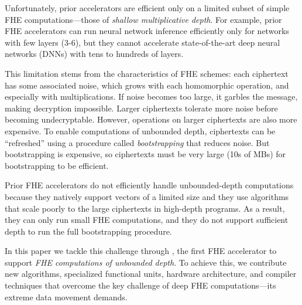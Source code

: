 Unfortunately, prior accelerators are efficient only on a limited subset of simple FHE
computations---those of \emph{shallow multiplicative depth}.
For example, prior FHE accelerators can run neural network inference efficiently only for networks with few layers (3-6),
but they cannot accelerate state-of-the-art deep neural networks (DNNs) with tens to hundreds of layers.

This limitation stems from the characteristics of FHE schemes:
each ciphertext has some associated noise, which grows with each homomorphic operation, and especially with multiplications.
If noise becomes too large, it garbles the message, making decryption impossible. 
Larger ciphertexts tolerate more noise before becoming undecryptable. 
However, operations on larger ciphertexts are also more expensive.
To enable computations of unbounded depth, ciphertexts can be ``refreshed'' using a procedure called \emph{bootstrapping}
that reduces noise. But bootstrapping is expensive, 
so ciphertexts must be very large (10s of MBs) for bootstrapping to be
efficient.

Prior FHE accelerators do not efficiently handle unbounded-depth computations because
they natively support vectors of a limited size and they use algorithms that scale poorly
to the large ciphertexts in high-depth programs.
As a result, they can only run small FHE computations, and they do not support sufficient depth
to run the full bootstrapping procedure.

\figWorkflow

In this paper we tackle this challenge through \name, the first FHE accelerator
to support \emph{FHE computations of unbounded depth}.
To achieve this, we contribute new algorithms, specialized functional units,
hardware architecture, and compiler techniques that overcome the key challenge
of deep FHE computations---its extreme data movement demands.


